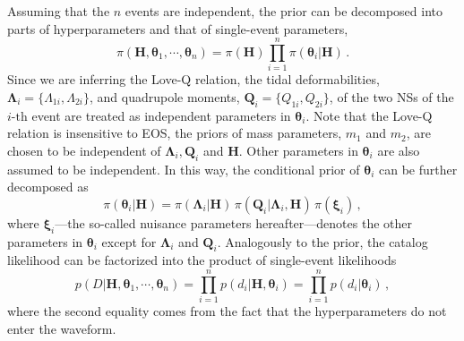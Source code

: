\documentclass[a4paper,11pt]{article}
\begin{document}
Assuming that the $n$ events are independent, the prior can be decomposed into
parts of hyperparameters and that of single-event parameters,
\begin{equation}
\label{bayes3}
\pi(\bm{H}, \bm{\theta}_1, \cdots,\bm{\theta}_n) = \pi(\bm{H}) \prod_{i=1}^n
\pi(\bm{\theta}_i|\bm{H})\,.
\end{equation}
Since we are inferring the Love-Q relation, the tidal deformabilities, $\bm
{\Lambda}_i=\{\Lambda_{1i},\Lambda_{2i}\}$, and quadrupole moments,
$\bm{Q}_i=\{Q_ {1i},Q_{2i}\}$, of the two NSs of the $i\text{-th}$ event are
treated as independent parameters in $\bm{\theta}_i$. Note that the Love-Q
relation is insensitive to EOS, the priors of mass parameters, $m_1$ and $m_2$,
are chosen to be independent of $\bm{\Lambda}_i, \bm{Q}_i$ and $\bm{H}$. Other
parameters in $\bm{\theta}_i$ are also assumed to be independent.  In this way,
the conditional prior of $\bm{\theta}_i$ can be further decomposed as
\begin{equation}
\label{prior}
\pi(\bm{\theta}_i|\bm{H}) = \pi(\bm{\Lambda}_i|\bm{H}) \,
\pi(\bm{Q}_i|\bm{\Lambda}_i,\bm{H}) \, \pi(\bm{\xi}_i)\,,
\end{equation}
where $\bm{\xi}_i$---the so-called nuisance parameters hereafter---denotes the
other parameters in $\bm{\theta}_i$ except for $\bm{\Lambda}_i$ and $\bm{Q}_i$.
Analogously to the prior, the catalog likelihood can be factorized into the
product of single-event likelihoods
\begin{equation}
    p(D|\bm{H},\bm{\theta}_1, \cdots,\bm{\theta}_n) = \prod_{i=1}^{n}
    p(d_i|\bm{H},\bm{\theta}_i)=\prod_{i=1}^{n}
    p(d_i|\bm{\theta}_i)\,,\label{eq:catalog_likelihood}
\end{equation}
where the second equality comes from the fact that the hyperparameters do not
enter the waveform.
\end{document}
